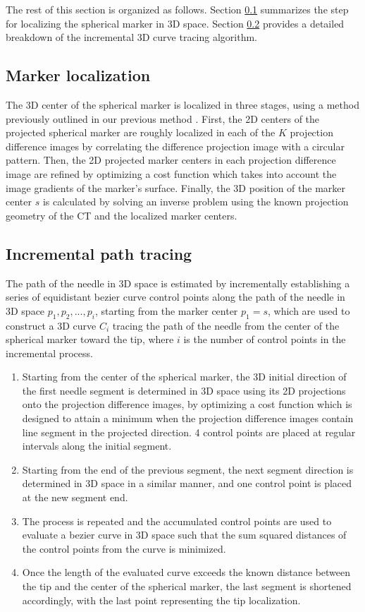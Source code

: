 \documentclass[letterpaper, 11 pt, conference]{ieeeconf}  %
\begin{document}
The rest of this section is organized as follows.
Section \ref{markerloc} summarizes the step for localizing the spherical marker in 3D space.
Section \ref{inctracing} provides a detailed breakdown of the incremental 3D curve tracing algorithm.

\subsection{Marker localization} \label{markerloc}
The 3D center of the spherical marker is localized in three stages, using a method previously outlined in our previous method \cite{medan2017reduced}. 
First, the 2D centers of the projected spherical marker are roughly localized in each of the $K$ projection difference images by correlating the difference projection image with a circular pattern. 
Then, the 2D projected marker centers in each projection difference image are refined by optimizing a cost function which takes into account the image gradients of the marker's surface.
Finally, the 3D position of the marker center $s$ is calculated by solving an inverse problem using the known projection geometry of the CT and the localized marker centers.

\subsection{Incremental path tracing} \label{inctracing}

The path of the needle in 3D space is estimated by incrementally establishing a series of equidistant bezier curve control points along the path of the needle in 3D space $p_1, p_2, ..., p_i$, starting from the marker center $p_1=s$, which are used to construct a 3D curve $C_i$ tracing the path of the needle from the center of the spherical marker toward the tip, where $i$ is the number of control points in the incremental process. 

\begin{enumerate}
    \item Starting from the center of the spherical marker, the 3D initial direction of the first needle segment is determined in 3D space using its 2D projections onto the projection difference images, by optimizing a cost function which is designed to attain a minimum when the projection difference images contain line segment in the projected direction. 4 control points are placed at regular intervals along the initial segment.
    \item Starting from the end of the previous segment, the next segment direction is determined in 3D space in a similar manner, and one control point is placed at the new segment end.
    \item The process is repeated and the accumulated control points are used to evaluate a bezier curve in 3D space such that the sum squared distances of the control points from the curve is minimized.
    \item Once the length of the evaluated curve exceeds the known distance between the tip and the center of the spherical marker, the last segment is shortened accordingly, with the last point representing the tip localization.
\end{enumerate}
\end{document}
